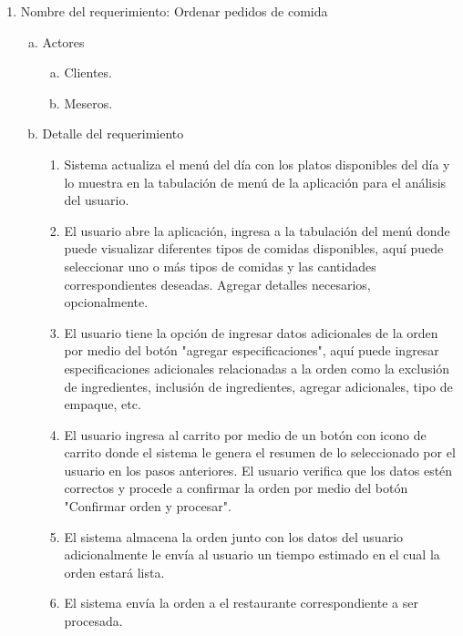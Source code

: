 \documentclass[conference]{IEEEtran}
\begin{document}

\begin{enumerate}
\item Nombre del requerimiento: Ordenar pedidos de comida

\begin{enumerate}[a)]
\item Actores
	\begin{enumerate}[a.]
	\item Clientes.
	\item Meseros.
	\end{enumerate}
	
\item Detalle del requerimiento
	\begin{enumerate}[P{a}so 1.]
	\item Sistema actualiza el menú del día con los platos disponibles del día y lo muestra en la tabulación de menú de la aplicación para el análisis del usuario.
	
\item El usuario abre la aplicación, ingresa a la tabulación del menú donde puede visualizar diferentes tipos de comidas disponibles, aquí puede seleccionar uno o más tipos de comidas y las cantidades correspondientes deseadas. Agregar detalles necesarios, opcionalmente.

\item El usuario tiene la opción de ingresar datos adicionales de la orden por medio del botón "agregar especificaciones", aquí puede ingresar especificaciones adicionales relacionadas a la orden como la exclusión de ingredientes, inclusión de ingredientes, agregar adicionales, tipo de empaque, etc.

\item El usuario ingresa al carrito por medio de un botón con icono de carrito donde el sistema le genera el resumen de lo seleccionado por el usuario en los pasos anteriores. El usuario verifica que los datos estén correctos y procede a confirmar la orden por medio del botón "Confirmar orden y procesar".
\item El sistema almacena la orden junto con los datos del usuario adicionalmente le envía al usuario un tiempo estimado en el cual la orden estará lista.
\item El sistema envía la orden a el restaurante correspondiente a ser procesada.


\end{enumerate}
\end{enumerate}
\end{enumerate}
\end{document}
